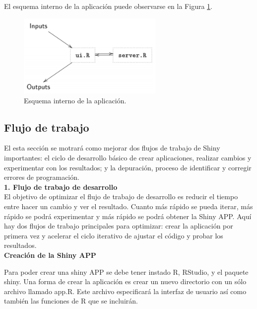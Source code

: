 El esquema interno de la aplicación puede observarse en la Figura \ref{fig:fig321}. 

\begin{figure}[H]
\begin{center}
\includegraphics[width=7cm]{./Graficos/figura7}
\end{center}
\caption{Esquema interno de la aplicación.}
\label{fig:fig321}
\end{figure}




\subsection{Flujo de trabajo}

El esta sección se motrará como mejorar dos flujos de trabajo de Shiny importantes: el ciclo de desarrollo básico de crear aplicaciones, realizar cambios y experimentar con los resultados; y la depuración, proceso de identificar y corregir errores de programación.\\


\textbf{1.\hspace{1cm} Flujo de trabajo de desarrollo}\\


El objetivo de optimizar el flujo de trabajo de desarrollo es reducir el tiempo entre hacer un cambio y ver el resultado. Cuanto más rápido se pueda iterar, más rápido se podrá experimentar y más rápido se podrá obtener la Shiny APP. Aquí hay dos flujos de trabajo principales para optimizar: crear la aplicación por primera vez y acelerar el ciclo iterativo de ajustar el código y probar los resultados.\\


\textbf{Creación de la Shiny APP}


Para poder crear una shiny APP se debe tener instado R, RStudio, y el paquete shiny. Una forma de crear la aplicación es crear un nuevo directorio con un sólo archivo llamado app.R. Este archivo especificará la interfaz de usuario así como también las funciones de R que se incluirán.

